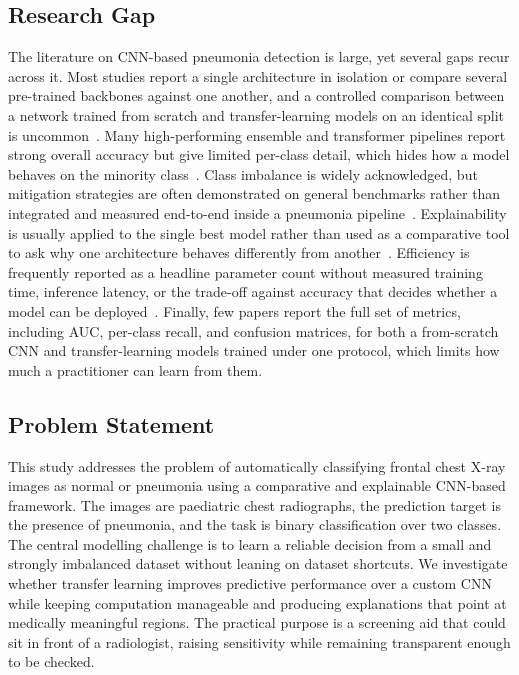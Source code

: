 \documentclass[preprint,12pt]{elsarticle}
\begin{document}
\subsection{Research Gap}
The literature on CNN-based pneumonia detection is large, yet several gaps recur across it.
Most studies report a single architecture in isolation or compare several pre-trained backbones against one another, and a controlled comparison between a network trained from scratch and transfer-learning models on an identical split is uncommon~\cite{ranjan2022transfer,mabrouk2022pneumonia}.
Many high-performing ensemble and transformer pipelines report strong overall accuracy but give limited per-class detail, which hides how a model behaves on the minority class~\cite{kundu2021pneumonia,selvarajan2024efficient}.
Class imbalance is widely acknowledged, but mitigation strategies are often demonstrated on general benchmarks rather than integrated and measured end-to-end inside a pneumonia pipeline~\cite{wu2022dataaugmentation,ding2025improving}.
Explainability is usually applied to the single best model rather than used as a comparative tool to ask why one architecture behaves differently from another~\cite{du2023classification,colin2025interpretable}.
Efficiency is frequently reported as a headline parameter count without measured training time, inference latency, or the trade-off against accuracy that decides whether a model can be deployed~\cite{alreshan2023mobilenet}.
Finally, few papers report the full set of metrics, including AUC, per-class recall, and confusion matrices, for both a from-scratch CNN and transfer-learning models trained under one protocol, which limits how much a practitioner can learn from them.

\subsection{Problem Statement}
This study addresses the problem of automatically classifying frontal chest X-ray images as normal or pneumonia using a comparative and explainable CNN-based framework.
The images are paediatric chest radiographs, the prediction target is the presence of pneumonia, and the task is binary classification over two classes.
The central modelling challenge is to learn a reliable decision from a small and strongly imbalanced dataset without leaning on dataset shortcuts.
We investigate whether transfer learning improves predictive performance over a custom CNN while keeping computation manageable and producing explanations that point at medically meaningful regions.
The practical purpose is a screening aid that could sit in front of a radiologist, raising sensitivity while remaining transparent enough to be checked.
\end{document}
